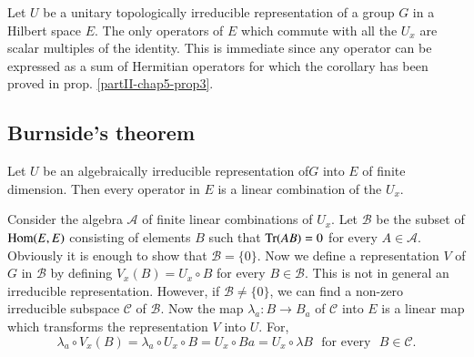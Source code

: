 \begin{coro*}%
 Let $U$ be a unitary topologically irreducible representation  of a
 group  $G$ in a Hilbert space $E$. The only operators of $E$ which
 commute with all the $U_{x} $  are scalar multiples of the
 identity. This is immediate since any operator can be expressed  as a
 sum of Hermitian operators  for which the corollary  has been proved
 in prop. \ref{partII-chap5-prop3}.  
\end{coro*} 
 
\subsection{Burnside's theorem}\label{partII-chap5-sec5.5}%

\setcounter{thm}{0}
\begin{thm}[Burnside]\label{partII-chap5-thm1}%
Let $U$ be an algebraically irreducible representation
of\pageoriginale $G$ into $E$ 
of  finite  dimension. Then every operator in $E$ is a linear
combination of the $U_{x}$. 
\end{thm}

Consider the algebra $\mathcal{A}$ of  finite linear combinations of
$U_{x}$. Let $\mathscr{B}$ be the subset of $\operatorname{Hom}(E,E)$ consisting  of
elements   $B$ such that $\operatorname{Tr}(AB)=0$  for every $A \in
\mathcal{A}$. Obviously it is enough  to  show that
$\mathscr{B}=\{0\}$.  Now  we  define a representation  $V$ of $G$ in
$\mathscr{B}$ by defining $V_{x} (B)  =  U_{x}\circ B$  for every $B \in
\mathscr{B}$. This  is not in general an irreducible
representation. However, if $ \mathscr{B} \neq \{0\}$, we can find  a
non-zero irreducible subspace $\mathscr{C}$ of $\mathscr{B}$. Now the
map $ \lambda_{a}: B \rightarrow  B _{a}$  of ${\mathscr{C}}$  into
$E$ is a linear map which transforms  the representation $V$ into
$U$. For, 
$$
\lambda _{a} \circ V_{x}(B) =  \lambda_{a}\circ U_{x}\circ B  =U_{x}
\circ B a  = U_{x}\circ
\lambda B \text{~ for every~ } B \in \mathscr{C}. 
$$

